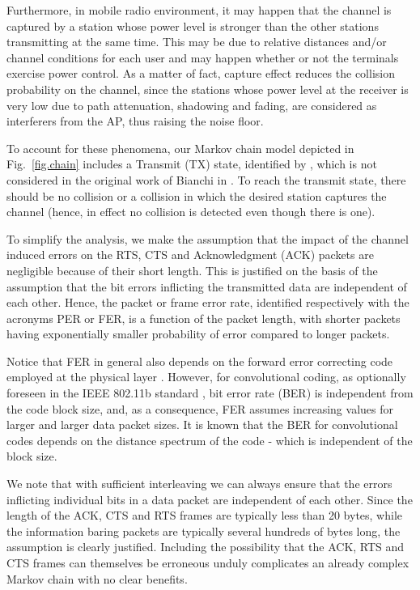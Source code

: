 \documentclass[10pt,onecolumn,a4paper]{IEEEtran}
\begin{document}
Furthermore, in mobile radio environment, it may happen that the
channel is captured by a station whose power level is stronger
than the other stations transmitting at the same time. This may be
due to relative distances and/or channel conditions for each user
and may happen whether or not the terminals exercise power
control. As a matter of fact, capture effect reduces the collision
probability on the channel, since the stations whose power level
at the receiver is very low due to path attenuation, shadowing and
fading, are considered as interferers from the AP, thus raising
the noise floor.

To account for these phenomena, our Markov chain model depicted in
Fig.~\ref{fig.chain} includes a Transmit (TX) state, identified by
, which is not considered in the
original work of Bianchi in \cite{Bianchi}. To reach the transmit state,
there should be no collision or a collision in which the desired station captures
the channel (hence, in effect no collision is detected even though there is one).

To simplify the analysis, we make the assumption that the impact
of the channel induced errors on the RTS, CTS and Acknowledgment
(ACK) packets are negligible because of their short length. This
is justified on the basis of the assumption that the bit errors
inflicting the transmitted data are independent of each other.
Hence, the packet or frame error rate, identified respectively
with the acronyms PER or FER, is a function of the packet length,
with shorter packets having exponentially smaller probability of
error compared to longer packets.

Notice that FER in general also depends on the forward error
correcting code employed at the physical layer
\cite{laddomada_3,laddomada_4}. However, for convolutional coding,
as optionally foreseen in the IEEE 802.11b standard
\cite{standard_DCF_MAC}, bit error rate (BER) is independent from
the code block size, and, as a consequence, FER assumes increasing
values for larger and larger data packet sizes. It is known
that the BER for convolutional codes depends on the distance
spectrum of the code \cite{proakis}-\cite{laddomada_2} which is
independent of the block size.

We note that with sufficient interleaving we can always ensure
that the errors inflicting individual bits in a data packet are
independent of each other. Since the length of the ACK, CTS and
RTS frames are typically less than 20 bytes, while the information
baring packets are typically several hundreds of bytes long, the
assumption is clearly justified. Including the possibility that
the ACK, RTS and CTS frames can themselves be erroneous unduly
complicates an already complex Markov chain with no clear
benefits.
\end{document}
